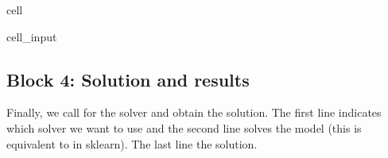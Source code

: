 \documentclass[letterpaper,10pt,english]{jupyterBook}
\begin{document}
\begin{sphinxuseclass}{cell}\begin{sphinxVerbatimInput}

\begin{sphinxuseclass}{cell_input}
\begin{sphinxVerbatim}[commandchars=\\\{\}]
\end{sphinxVerbatim}

\end{sphinxuseclass}\end{sphinxVerbatimInput}

\end{sphinxuseclass}

\subsection{Block 4: Solution and results}
\label{\detokenize{docs/Case2_1_Module1_Online_Fulfillment_Script:block-4-solution-and-results}}
\sphinxAtStartPar
Finally, we call for the solver and obtain the solution. The first line indicates which solver we want to use and the second line solves the model (this is equivalent to  in sklearn). The last line  the solution.
\end{document}
